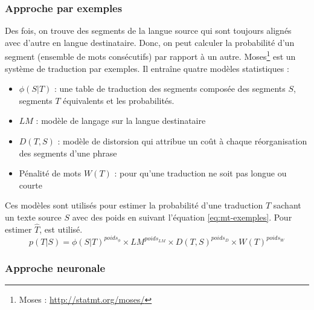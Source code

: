 \documentclass{KodeBook}
\begin{document}
\subsubsection{Approche par exemples}

Des fois, on trouve des segments de la langue source qui sont toujours alignés avec d'autre en langue destinataire.
Donc, on peut calculer la probabilité d'un segment (ensemble de mots consécutifs) par rapport à un autre. 
Moses\footnote{Moses : \url{http://statmt.org/moses/}} \cite{07-koehn-al} est un système de traduction par exemples.
Il entraîne quatre modèles statistiques :
\begin{itemize}
	\item $\phi(S|T)$ : une table de traduction des segments  composée des segments $S$, segments $T$ équivalents et les probabilités.
	\item $LM$ : modèle de langage sur la langue destinataire 
	\item $ D(T, S) $ : modèle de distorsion qui attribue un coût à chaque réorganisation des segments d'une phrase  
	\item Pénalité de mots $W(T)$ : pour qu'une traduction ne soit pas longue ou courte
\end{itemize}
Ces modèles sont utilisés pour estimer la probabilité d'une traduction $T$ sachant un texte source $S$ avec des poids en suivant l'équation \ref{eq:mt-exemples}.
Pour estimer $\hat{T}$,  est utilisé.
\begin{equation}\label{eq:mt-exemples}
p(T|S) = \phi(S|T)^{poids_{\phi}} \times LM^{poids_{LM}} \times D(T, S)^{poids_{D}} \times W(T)^{poids_{W}}
\end{equation}

\subsubsection{Approche neuronale}
\end{document}
